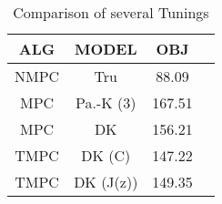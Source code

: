 \documentclass[preprint,12pt,authoryear]{elsarticle}
\begin{document}
\begin{table}[h]
  \centering
  \caption{Comparison of several Tunings}
  \label{tab:ident-comp}
  \begin{tabular}{cccc}
      \toprule
        ALG & MODEL & OBJ \\
        \midrule
        NMPC & Tru & 88.09  \\%
        MPC & Pa.-K (3) & 167.51  \\
        MPC & DK & 156.21  \\
        TMPC & DK (C) & 147.22  \\
        TMPC & DK (J(z)) & 149.35  \\
        \bottomrule
  \end{tabular}
\end{table}

%
\end{document}
